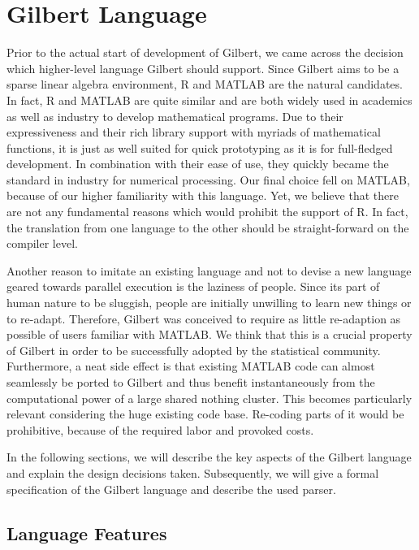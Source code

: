 \chapter{Gilbert Language}
\label{cha:gilbertlanguage}


Prior to the actual start of development of Gilbert, we came across the decision which higher-level language Gilbert should support.
Since Gilbert aims to be a sparse linear algebra environment, R and MATLAB are the natural candidates.
In fact, R and MATLAB are quite similar and are both widely used in academics as well as industry to develop mathematical programs.
Due to their expressiveness and their rich library support with myriads of mathematical functions, it is just as well suited for quick prototyping as it is for full-fledged development.
In combination with their ease of use, they quickly became the standard in industry for numerical processing.
Our final choice fell on MATLAB, because of our higher familiarity with this language.
Yet, we believe that there are not any fundamental reasons which would prohibit the support of R.
In fact, the translation from one language to the other should be straight-forward on the compiler level.

Another reason to imitate an existing language and not to devise a new language geared towards parallel execution is the laziness of people.
Since its part of human nature to be sluggish, people are initially unwilling to learn new things or to re-adapt.
Therefore, Gilbert was conceived to require as little re-adaption as possible of users familiar with MATLAB.
We think that this is a crucial property of Gilbert in order to be successfully adopted by the statistical community.
Furthermore, a neat side effect is that existing MATLAB code can almost seamlessly be ported to Gilbert and thus benefit instantaneously from the computational power of a large shared nothing cluster.
This becomes particularly relevant considering the huge existing code base.
Re-coding parts of it would be prohibitive, because of the required labor and provoked costs.

In the following sections, we will describe the key aspects of the Gilbert language and explain the design decisions taken.
Subsequently, we will give a formal specification of the Gilbert language and describe the used parser.

\section{Language Features}
\label{sec:languageFeatures}

